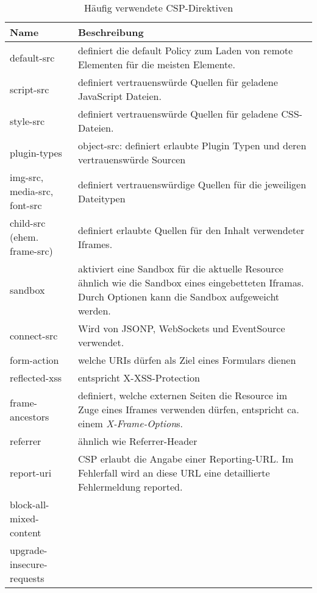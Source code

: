 \begin{table}
	\begin{center}
\begin{tabular}{lp{10cm}}
	\toprule
	Name & Beschreibung\\ \midrule
	default-src & definiert die default Policy zum Laden von remote Elementen für die meisten Elemente. \\
	script-src & definiert vertrauenswürde Quellen für geladene JavaScript Dateien. \\
	style-src & definiert vertrauenswürde Quellen für geladene CSS-Dateien. \\
	plugin-types & object-src: definiert erlaubte Plugin Typen und deren vertrauenswürde Sourcen \\
	img-src, media-src, font-src & definiert vertrauenswürdige Quellen für die jeweiligen Dateitypen \\
	child-src (ehem. frame-src) &  definiert erlaubte Quellen für den Inhalt verwendeter Iframes. \\
	sandbox & aktiviert eine Sandbox für die aktuelle Resource ähnlich wie die Sandbox eines eingebetteten Iframas. Durch Optionen kann die Sandbox aufgeweicht werden. \\
	connect-src & Wird von JSONP, WebSockets und EventSource verwendet. \\
	form-action & welche URIs dürfen als Ziel eines Formulars dienen \\
	reflected-xss & entspricht X-XSS-Protection \\
	frame-ancestors & definiert, welche externen Seiten die Resource im Zuge eines Iframes verwenden dürfen, entspricht ca. einem \textit{X-Frame-Option}s. \\
	referrer & ähnlich wie Referrer-Header \\
	report-uri & CSP erlaubt die Angabe einer Reporting-URL. Im Fehlerfall wird an diese URL eine detaillierte Fehlermeldung reported. \\
	block-all-mixed-content & \\
	upgrade-insecure-requests & \\
	\bottomrule
\end{tabular}
	\caption{Häufig verwendete CSP-Direktiven}
	\label{tbl:csp_elements}
\end{center}
\end{table}

